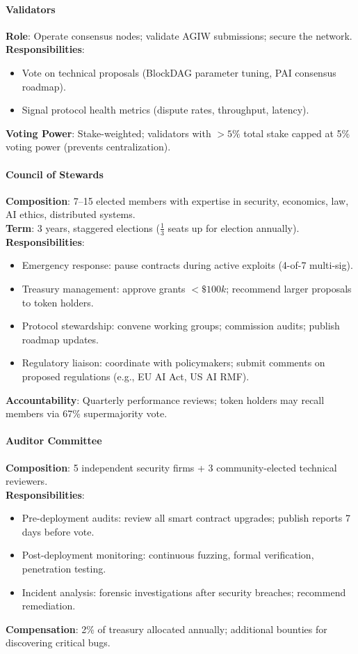 \documentclass[11pt]{article}
\begin{document}
\paragraph{Validators}
\textbf{Role}: Operate consensus nodes; validate AGIW submissions; secure the network.\\
\textbf{Responsibilities}:
\begin{itemize}[noitemsep]
  \item Vote on technical proposals (BlockDAG parameter tuning, PAI consensus roadmap).
  \item Signal protocol health metrics (dispute rates, throughput, latency).
\end{itemize}
\textbf{Voting Power}: Stake-weighted; validators with $>5\%$ total stake capped at 5\% voting power (prevents centralization).

\paragraph{Council of Stewards}
\textbf{Composition}: 7--15 elected members with expertise in security, economics, law, AI ethics, distributed systems.\\
\textbf{Term}: 3 years, staggered elections ($\frac{1}{3}$ seats up for election annually).\\
\textbf{Responsibilities}:
\begin{itemize}[noitemsep]
  \item Emergency response: pause contracts during active exploits (4-of-7 multi-sig).
  \item Treasury management: approve grants $<\$100k$; recommend larger proposals to token holders.
  \item Protocol stewardship: convene working groups; commission audits; publish roadmap updates.
  \item Regulatory liaison: coordinate with policymakers; submit comments on proposed regulations (e.g., EU AI Act, US AI RMF).
\end{itemize}
\textbf{Accountability}: Quarterly performance reviews; token holders may recall members via 67\% supermajority vote.

\paragraph{Auditor Committee}
\textbf{Composition}: 5 independent security firms + 3 community-elected technical reviewers.\\
\textbf{Responsibilities}:
\begin{itemize}[noitemsep]
  \item Pre-deployment audits: review all smart contract upgrades; publish reports 7 days before vote.
  \item Post-deployment monitoring: continuous fuzzing, formal verification, penetration testing.
  \item Incident analysis: forensic investigations after security breaches; recommend remediation.
\end{itemize}
\textbf{Compensation}: 2\% of treasury allocated annually; additional bounties for discovering critical bugs.
\end{document}

